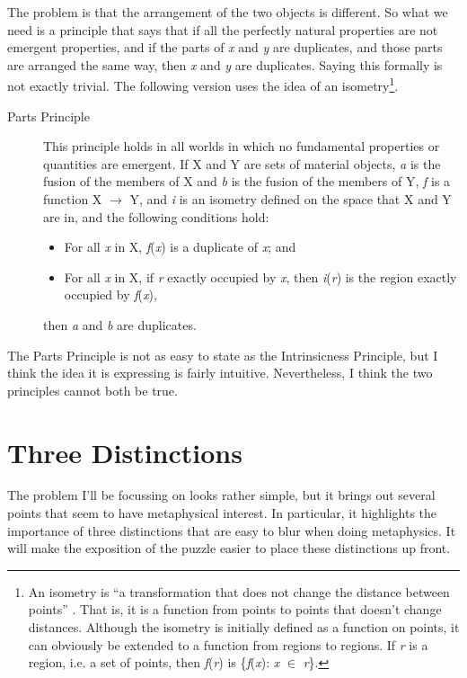 \noindent The problem is that the arrangement of the two objects is different. So what we need is a principle that says that if all the perfectly natural properties are not emergent properties, and if the parts of \textit{x} and \textit{y} are duplicates, and those parts are arranged the same way, then \textit{x} and \textit{y} are duplicates. Saying this formally is not exactly trivial. The following version uses the idea of an isometry\footnote{An isometry is ``a transformation that does not change the distance between points'' \cite[11]{Yaglom1962}. That is, it is a function from points to points that doesn't change distances. Although the isometry is initially defined as a function on points, it can obviously be extended to a function from regions to regions. If \textit{r} is a region, i.e. a set of points, then \textit{f}(\textit{r}) is \{\textit{f}(\textit{x}): \textit{x} ${\in}$ \textit{r}\}.}. 

\begin{description}
\item[Parts Principle] This principle holds in all worlds in which no fundamental properties or quantities are emergent. If X and Y are sets of material objects, \textit{a} is the fusion of the members of X and \textit{b} is the fusion of the members of Y, \textit{f} is a function X ${\rightarrow}$ Y, and \textit{i} is an isometry defined on the space that X and Y are in, and the following conditions hold:
\begin{itemize}
\item For all \textit{x} in X, \textit{f}(\textit{x}) is a duplicate of \textit{x}; and
\item For all \textit{x} in X, if \textit{r} exactly occupied by \textit{x}, then \textit{i}(\textit{r}) is the region exactly occupied by \textit{f}(\textit{x}),
\end{itemize}
then \textit{a} and \textit{b} are duplicates.
\end{description}

\noindent The Parts Principle is not as easy to state as the Intrinsicness Principle, but I think the idea it is expressing is fairly intuitive. Nevertheless, I think the two principles cannot both be true.

\section{Three Distinctions}

The problem I'll be focussing on looks rather simple, but it brings out several points that seem to have metaphysical interest. In particular, it highlights the importance of three distinctions that are easy to blur when doing metaphysics. It will make the exposition of the puzzle easier to place these distinctions up front.

